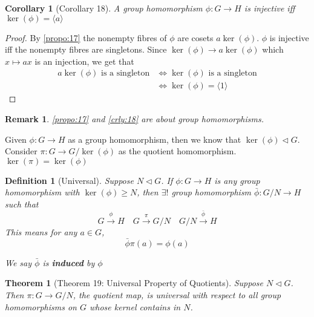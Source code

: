 \documentclass[11pt, oneside]{book}
\theoremstyle{break}
\newtheorem{thm}{Theorem}[section]
\newtheorem*{proof}{Proof}
\newtheorem{crly}{Corollary}[section]
\newtheorem*{remark}{Remark}
\newtheorem{defn}{Definition}[section]
\begin{document}
\begin{crly}[Corollary 18]\label{crly:18}
    A group homomorphism $\phi: G \to H$ is injective iff $\ker(\phi) = \langle a \rangle$
\end{crly}

\begin{proof}
    By \autoref{propo:17} the nonempty fibres of $\phi$ are cosets $a \ker(\phi)$. $\phi$ is injective iff the nonempty fibres are singletons. Since $\ker(\phi) \to a\ker(\phi)$ which $x \mapsto ax$ is an injection, we get that
    \begin{align*}
        a \ker(\phi) \text{ is a singleton} &\iff \ker(\phi) \text{ is a singleton} \\
            &\iff \ker(\phi) = \langle 1 \rangle
    \end{align*}
\end{proof}

\begin{remark}
    \autoref{propo:17} and \autoref{crly:18} are about group homomorphisms.
\end{remark}

Given $\phi : G \to H$ as a group homomorphism, then we know that $\ker(\phi) \triangleleft G$. Consider $\pi : G \to G / \ker(\phi)$ as the quotient homomorphism. $\ker(\pi) = \ker(\phi)$

\begin{defn}[Universal]
    Suppose $N \triangleleft G$. If $\phi: G \to H$ is any group homomorphism with $\ker(\phi) \geq N$, then $\exists!$ group homomorphism $\bar{\phi} : G / N \to H$ such that
    \begin{equation}
        G \overset{\phi}{\to} H \quad G \overset{\pi}{\to} G / N \quad G / N \overset{\bar{\phi}}{\to} H
    \end{equation}
    This means for any $a \in G$,
    \begin{equation}
        \bar{\phi} \pi(a) = \phi(a)
    \end{equation}

    We say $\bar{\phi}$ is \textbf{induced} by $\phi$
\end{defn}

\begin{thm}[Theorem 19: Universal Property of Quotients]\label{thm:19}
    Suppose $N \triangleleft G$. Then $\pi : G \to G / N$, the quotient map, is universal with respect to all group homomorphisms on $G$ whose kernel contains in $N$.
\end{thm}
\end{document}
